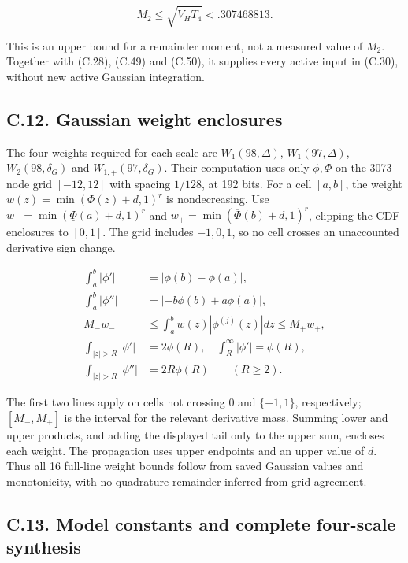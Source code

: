 \documentclass{article}
\begin{document}
\[
M_2\le\sqrt{V_H\overline T_4}<.307468813.
\tag{C.54}
\]

This is an upper bound for a remainder moment, not a measured value of
\(M_2\). Together with (C.28), (C.49) and (C.50), it supplies every
active input in (C.30), without new active Gaussian integration.

\subsection*{C.12. Gaussian weight
enclosures}\label{c.12.-gaussian-weight-enclosures}

The four weights required for each scale are \(W_1(98,\Delta)\),
\(W_1(97,\Delta)\), \(W_2(98,\delta_G)\) and \(W_{1,+}(97,\delta_G)\).
Their computation uses only \(\phi,\Phi\) on the 3073-node grid
\([-12,12]\) with spacing \(1/128\), at 192 bits. For a cell \([a,b]\),
the weight \(w(z)=\min(\Phi(z)+d,1)^r\) is nondecreasing. Use
\(w_- =\min(\underline\Phi(a)+d,1)^r\) and
\(w_+=\min(\overline\Phi(b)+d,1)^r\), clipping the CDF enclosures to
\([0,1]\). The grid includes \(-1,0,1\), so no cell crosses an
unaccounted derivative sign change.

\[
\begin{aligned}
\int_a^b|\phi'|&=|\phi(b)-\phi(a)|,\\
\int_a^b|\phi''|&=|-b\phi(b)+a\phi(a)|,\\
M_-w_-&\le\int_a^bw(z)|\phi^{(j)}(z)|dz\le M_+w_+,\\
\int_{|z|>R}|\phi'|&=2\phi(R),\quad \int_R^\infty|\phi'|=\phi(R),\\
\int_{|z|>R}|\phi''|&=2R\phi(R)\qquad(R\ge2).
\end{aligned}
\tag{C.55}
\]

The first two lines apply on cells not crossing \(0\) and \(\{-1,1\}\),
respectively; \([M_-,M_+]\) is the interval for the relevant derivative
mass. Summing lower and upper products, and adding the displayed tail
only to the upper sum, encloses each weight. The propagation uses upper
endpoints and an upper value of \(d\). Thus all 16 full-line weight
bounds follow from saved Gaussian values and monotonicity, with no
quadrature remainder inferred from grid agreement.

\subsection*{C.13. Model constants and complete four-scale
synthesis}\label{c.13.-model-constants-and-complete-four-scale-synthesis}
\end{document}
